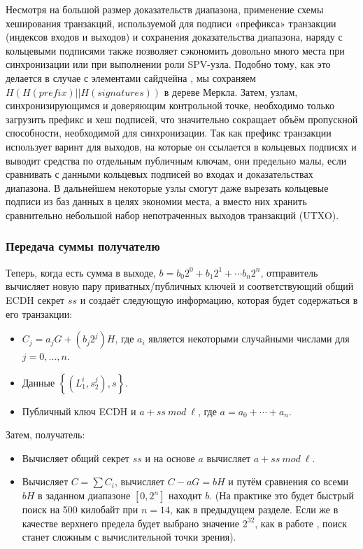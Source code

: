 \documentclass{mrl}
\theoremstyle{definition}
\numberwithin{thm}{section}
\begin{document}
Несмотря на большой размер доказательств диапазона, применение схемы хеширования транзакций, используемой для подписи «префикса» транзакции (индексов входов и выходов) и сохранения доказательства диапазона, наряду с кольцевыми подписями также позволяет сэкономить довольно много места при синхронизации или при выполнении роли SPV-узла. Подобно тому, как это делается в случае с элементами сайдчейна \cite{El}, мы сохраняем $H(H(prefix) || H(signatures))$ в дереве Меркла. Затем, узлам, синхронизирующимся и доверяющим контрольной точке, необходимо только загрузить префикс и хеш подписей, что значительно сокращает объём пропускной способности, необходимой для синхронизации. Так как префикс транзакции использует варинт для выходов, на которые он ссылается в кольцевых подписях и выводит средства по отдельным публичным ключам, они предельно малы, если сравнивать с данными кольцевых подписей во входах и доказательствах диапазона. В дальнейшем некоторые узлы смогут даже вырезать кольцевые подписи из баз данных в целях экономии места, а вместо них хранить сравнительно небольшой набор непотраченных выходов транзакций (UTXO).
\subsubsection{Передача суммы получателю}
Теперь, когда есть сумма в выходе, $b = b_0 2^0 + b_1 2^1 + \cdots b_n 2^n $, отправитель вычисляет новую пару приватных/публичных ключей и соответствующий общий ECDH секрет $ss$ и создаёт следующую информацию, которая будет содержаться в его транзакции:
\begin{itemize}
 \item $C_j = a_j G + (b_j 2^j) H$, где $a_i$ является некоторыми случайными числами для $j=0,...,n$.
 \item Данные $\left\{(L_1^i, s_2^j),s\right\}$.
 \item Публичный ключ ECDH и $a + ss\ mod\ \ell$, где $a = a_0 + \cdots + a_n$.
\end{itemize}
Затем, получатель:
\begin{itemize}
 \item Вычисляет общий секрет $ss$ и на основе $a$ вычисляет $a + ss\ mod\ \ell$.
 \item Вычисляет $C = \sum C_i$, вычисляет $C - aG = bH$ и путём сравнения со всеми $bH$ в заданном диапазоне $[0, 2^n]$ находит $b$. (На практике это будет быстрый поиск на 500 килобайт при $n = 14$, как в предыдущем разделе. Если же в качестве верхнего предела будет выбрано значение $2^{32}$, как в работе \cite{GM}, поиск станет сложным с вычислительной точки зрения).
\end{itemize}
\end{document}

